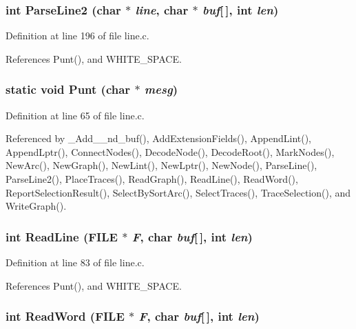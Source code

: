 \subsubsection{\setlength{\rightskip}{0pt plus 5cm}int Parse\-Line2 (char $\ast$ {\em line}, char $\ast$ {\em buf}[$\,$], int {\em len})}\label{line_8c_ff4d1d50c2aca693635d4e0236dfbf76}




Definition at line 196 of file line.c.

References Punt(), and WHITE\_\-SPACE.
\subsubsection{\setlength{\rightskip}{0pt plus 5cm}static void Punt (char $\ast$ {\em mesg})\hspace{0.3cm}{\tt  [static]}}\label{line_8c_5e4a7703cc8669ffef811a7f4a99562f}




Definition at line 65 of file line.c.

Referenced by \_\-Add\_\_\-nd\_\-buf(), Add\-Extension\-Fields(), Append\-Lint(), Append\-Lptr(), Connect\-Nodes(), Decode\-Node(), Decode\-Root(), Mark\-Nodes(), New\-Arc(), New\-Graph(), New\-Lint(), New\-Lptr(), New\-Node(), Parse\-Line(), Parse\-Line2(), Place\-Traces(), Read\-Graph(), Read\-Line(), Read\-Word(), Report\-Selection\-Result(), Select\-By\-Sort\-Arc(), Select\-Traces(), Trace\-Selection(), and Write\-Graph().
\subsubsection{\setlength{\rightskip}{0pt plus 5cm}int Read\-Line (FILE $\ast$ {\em F}, char {\em buf}[$\,$], int {\em len})}\label{line_8c_31b3960aa0f504b47aacaa271c8ea85f}




Definition at line 83 of file line.c.

References Punt(), and WHITE\_\-SPACE.
\subsubsection{\setlength{\rightskip}{0pt plus 5cm}int Read\-Word (FILE $\ast$ {\em F}, char {\em buf}[$\,$], int {\em len})}\label{line_8c_9de51effd85ca271148cb40c7c271b14}




